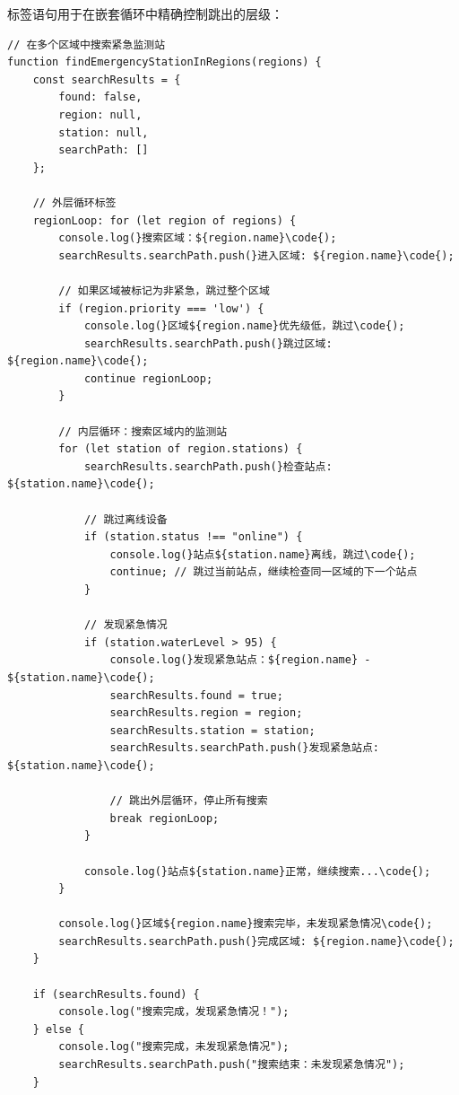 {

标签语句用于在嵌套循环中精确控制跳出的层级：

\begin{lstlisting}[style=javascript]
// 在多个区域中搜索紧急监测站
function findEmergencyStationInRegions(regions) {
    const searchResults = {
        found: false,
        region: null,
        station: null,
        searchPath: []
    };
    
    // 外层循环标签
    regionLoop: for (let region of regions) {
        console.log(}搜索区域：${region.name}\code{);
        searchResults.searchPath.push(}进入区域: ${region.name}\code{);
        
        // 如果区域被标记为非紧急，跳过整个区域
        if (region.priority === 'low') {
            console.log(}区域${region.name}优先级低，跳过\code{);
            searchResults.searchPath.push(}跳过区域: ${region.name}\code{);
            continue regionLoop;
        }
        
        // 内层循环：搜索区域内的监测站
        for (let station of region.stations) {
            searchResults.searchPath.push(}检查站点: ${station.name}\code{);
            
            // 跳过离线设备
            if (station.status !== "online") {
                console.log(}站点${station.name}离线，跳过\code{);
                continue; // 跳过当前站点，继续检查同一区域的下一个站点
            }
            
            // 发现紧急情况
            if (station.waterLevel > 95) {
                console.log(}发现紧急站点：${region.name} - ${station.name}\code{);
                searchResults.found = true;
                searchResults.region = region;
                searchResults.station = station;
                searchResults.searchPath.push(}发现紧急站点: ${station.name}\code{);
                
                // 跳出外层循环，停止所有搜索
                break regionLoop;
            }
            
            console.log(}站点${station.name}正常，继续搜索...\code{);
        }
        
        console.log(}区域${region.name}搜索完毕，未发现紧急情况\code{);
        searchResults.searchPath.push(}完成区域: ${region.name}\code{);
    }
    
    if (searchResults.found) {
        console.log("搜索完成，发现紧急情况！");
    } else {
        console.log("搜索完成，未发现紧急情况");
        searchResults.searchPath.push("搜索结束：未发现紧急情况");
    }
    

\end{lstlisting}}
